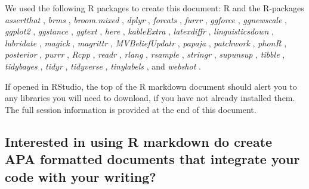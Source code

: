\documentclass[
  11pt,
  man,mask,floatsintext]{apa6}
\begin{document}
We used the following R packages to create this document: R \autocite[Version 4.4.1;][]{R-base} and the R-packages \emph{assertthat} \autocite[Version 0.2.1;][]{R-assertthat}, \emph{brms} \autocites[Version 2.21.0;][]{R-brms_a,R-brms_b,R-brms_c}, \emph{broom.mixed} \autocite[Version 0.2.9.5;][]{R-broom.mixed}, \emph{dplyr} \autocite[Version 1.1.4;][]{R-dplyr}, \emph{forcats} \autocite[Version 1.0.0;][]{R-forcats}, \emph{furrr} \autocite[Version 0.3.1;][]{R-furrr}, \emph{ggforce} \autocite[Version 0.4.2;][]{R-ggforce}, \emph{ggnewscale} \autocite[Version 0.5.0;][]{R-ggnewscale}, \emph{ggplot2} \autocite[Version 3.5.1;][]{R-ggplot2}, \emph{ggstance} \autocite[Version 0.3.7;][]{R-ggstance}, \emph{ggtext} \autocite[Version 0.1.2;][]{R-ggtext}, \emph{here} \autocite[Version 1.0.1;][]{R-here}, \emph{kableExtra} \autocite[Version 1.4.0;][]{R-kableExtra}, \emph{latexdiffr} \autocite[Version 0.2.0;][]{R-latexdiffr}, \emph{linguisticsdown} \autocite[Version 1.2.0;][]{R-linguisticsdown}, \emph{lubridate} \autocite[Version 1.9.3;][]{R-lubridate}, \emph{magick} \autocite[Version 2.8.4;][]{R-magick}, \emph{magrittr} \autocite[Version 2.0.3;][]{R-magrittr}, \emph{MVBeliefUpdatr} \autocite[Version 0.0.1.10;][]{R-MVBeliefUpdatr}, \emph{papaja} \autocite[Version 0.1.1.9001;][]{R-papaja}, \emph{patchwork} \autocite[Version 1.2.0;][]{R-patchwork}, \emph{phonR} \autocite[Version 1.0.7;][]{R-phonR}, \emph{posterior} \autocite[Version 1.6.0;][]{R-posterior}, \emph{purrr} \autocite[Version 1.0.2;][]{R-purrr}, \emph{Rcpp} \autocite[Version 1.0.13;][]{R-Rcpp}, \emph{readr} \autocite[Version 2.1.5;][]{R-readr}, \emph{rlang} \autocite[Version 1.1.4;][]{R-rlang}, \emph{rsample} \autocite[Version 1.2.1;][]{R-rsample}, \emph{stringr} \autocite[Version 1.5.1;][]{R-stringr}, \emph{supunsup} \autocite[Version 0.2.0;][]{R-supunsup}, \emph{tibble} \autocite[Version 3.2.1;][]{R-tibble}, \emph{tidybayes} \autocite[Version 3.0.6;][]{R-tidybayes}, \emph{tidyr} \autocite[Version 1.3.1;][]{R-tidyr}, \emph{tidyverse} \autocite[Version 2.0.0;][]{R-tidyverse}, \emph{tinylabels} \autocite[Version 0.2.4;][]{R-tinylabels}, and \emph{webshot} \autocite[Version 0.5.5;][]{R-webshot}.

If opened in RStudio, the top of the R markdown document should alert you to any libraries you will need to download, if you have not already installed them. The full session information is provided at the end of this document.

\subsection{Interested in using R markdown do create APA formatted documents that integrate your code with your writing?}\label{interested-in-using-r-markdown-do-create-apa-formatted-documents-that-integrate-your-code-with-your-writing}
\end{document}
